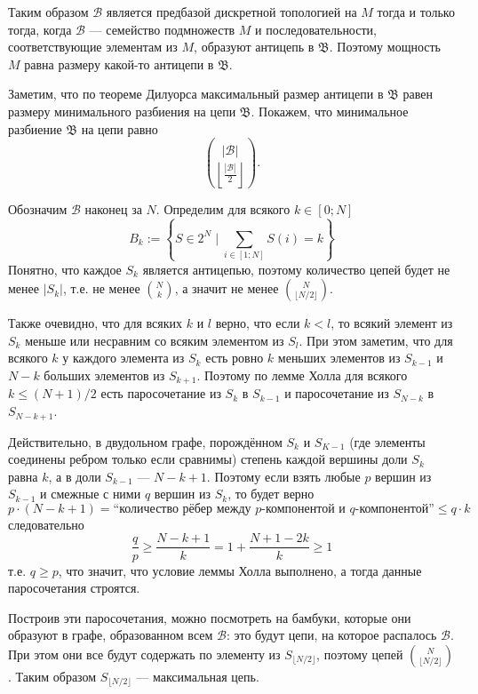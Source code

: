 \documentclass[12pt,a4paper]{article}
\begin{document}
\begin{problem}{14}
\begin{enumerate}
                Таким образом $\mathcal{B}$ является предбазой дискретной топологией на $M$ тогда и только тогда, когда $\mathcal{B}$ --- семейство подмножеств $M$ и последовательности, соответствующие элементам из $M$, образуют антицепь в $\mathfrak{B}$. Поэтому мощность $M$ равна размеру какой-то антицепи в $\mathfrak{B}$.

                Заметим, что по теореме Дилуорса максимальный размер антицепи в $\mathfrak{B}$ равен размеру минимального разбиения на цепи $\mathfrak{B}$. Покажем, что минимальное разбиение $\mathfrak{B}$ на цепи равно
                \[\binom{|\mathcal{B}|}{\left\lfloor \frac{|\mathcal{B}|}{2} \right\rfloor}.\]

                Обозначим $\mathcal{B}$ наконец за $N$. Определим для всякого $k \in [0; N]$
                \[
                    B_k := \left\{S \in 2^{N} \mid \sum_{i \in [1; N]} S(i) = k\right\}
                \]
                Понятно, что каждое $S_k$ является антицепью, поэтому количество цепей будет не менее $|S_k|$, т.е. не менее $\binom{N}{k}$, а значит не менее $\binom{N}{\lfloor N/2 \rfloor}$.
                
                Также очевидно, что для всяких $k$ и $l$ верно, что если $k < l$, то всякий элемент из $S_k$ меньше или несравним со всяким элементом из $S_l$. При этом заметим, что для всякого $k$ у каждого элемента из $S_k$ есть ровно $k$ меньших элементов из $S_{k-1}$ и $N-k$ больших элементов из $S_{k+1}$. Поэтому по лемме Холла для всякого $k \leqslant (N+1)/2$ есть паросочетание из $S_k$ в $S_{k-1}$ и паросочетание из $S_{N-k}$ в $S_{N-k+1}$.

                Действительно, в двудольном графе, порождённом $S_k$ и $S_{K-1}$ (где элементы соединены ребром только если сравнимы) степень каждой вершины доли $S_k$ равна $k$, а в доли $S_{k-1}$ --- $N - k + 1$. Поэтому если взять любые $p$ вершин из $S_{k-1}$ и смежные с ними $q$ вершин из $S_k$, то будет верно
                \[p \cdot (N - k + 1) = \text{``количество рёбер между $p$-компонентой и $q$-компонентой''} \leqslant q \cdot k\]
                следовательно
                \[\frac{q}{p} \geqslant \frac{N - k + 1}{k} = 1 + \frac{N + 1 - 2k}{k} \geqslant 1\]
                т.е. $q \geqslant p$, что значит, что условие леммы Холла выполнено, а тогда данные паросочетания строятся.

                Построив эти паросочетания, можно посмотреть на бамбуки, которые они образуют в графе, образованном всем $\mathcal{B}$: это будут цепи, на которое распалось $\mathcal{B}$. При этом они все будут содержать по элементу из $S_{\lfloor N/2 \rfloor}$, поэтому цепей $\binom{N}{\lfloor N/2 \rfloor}$. Таким образом $S_{\lfloor N/2 \rfloor}$ --- максимальная цепь.


\end{enumerate}
\end{problem}
\end{document}
